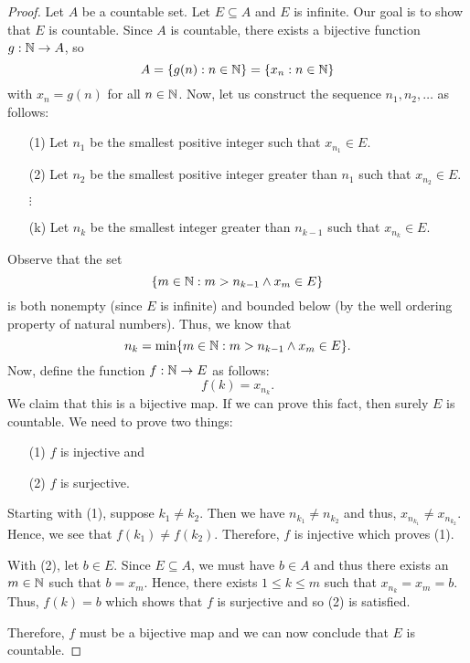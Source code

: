 \documentclass[a4paper]{report}
\begin{document}
\begin{proof}
Let \( A  \) be a countable set. Let \( E \subseteq A  \) and \( E  \) is infinite. Our goal is to show that \( E  \) is countable. Since \( A  \) is countable, there exists a bijective function \( g: \mathbb{N} \to A  \), so 
\[  A = \{ g(n) : n \in \mathbb{N} \} = \{ {x}_{n} : n \in \mathbb{N} \} \]
with \( {x}_{n} = g(n) \) for all \( n \in \mathbb{N} \).
Now, let us construct the sequence \( {n}_{1}, {n}_{2}, \dots  \) as follows: 
\begin{enumerate}
    \item[(1)] Let \( {n}_{1}  \) be the smallest positive integer such that \( {x}_{{n}_{1}} \in E  \). 
    \item[(2)] Let \( {n}_{2} \) be the smallest positive integer greater than \( {n}_{1}  \) such that \( {x}_{{n}_{2}} \in E  \). 
    \item[\( \vdots \)]
    \item[(k)] Let \( {n}_{k} \) be the smallest integer greater than \( {n}_{k - 1}  \) such that \( {x}_{{n}_{k}} \in E  \).
\end{enumerate}
Observe that the set 
\[  \{ m \in \mathbb{N} :  m > {n}_{k-1} \wedge {x}_{m} \in E  \}   \]
is both nonempty (since \( E  \) is infinite) and bounded below (by the well ordering property of natural numbers). Thus, we know that  
\[  {n}_{k} = \min \{ m \in \mathbb{N} : m > {n}_{k-1} \wedge {x}_{m} \in E  \}. \]
Now, define the function \( f: \mathbb{N} \to E  \) as follows:
\[  f(k) = {x}_{{n}_{k}}. \]
We claim that this is a bijective map. If we can prove this fact, then surely \( E  \) is countable. We need to prove two things:
\begin{enumerate}
    \item[(1)] \( f \) is injective and
    \item[(2)] \( f  \) is surjective.
\end{enumerate}
Starting with (1), suppose \( {k}_{1} \neq {k}_{2}  \). Then we have \( {n}_{{k}_{1}} \neq {n}_{{k}_{2}} \) and thus, \( {x}_{{n}_{{k}_{1}}} \neq {x}_{{n}_{{k}_{2}}} \). Hence, we see that \( f({k}_{1}) \neq f({k}_{2}) \). Therefore, \( f  \) is injective which proves (1).

With (2), let \( b \in E  \). Since \( E \subseteq  A  \), we must have \( b \in A  \) and thus there exists an \( m \in \mathbb{N}  \) such that \( b = {x}_{m} \). Hence, there exists \( 1 \leq k \leq m  \) such that \( {x}_{{n}_{k}} = {x}_{m} = b \). Thus, \( f(k) = b \) which shows that \( f  \) is surjective and so (2) is satisfied.

Therefore, \( f  \) must be a bijective map and we can now conclude that \( E \) is countable.
\end{proof}
\end{document}
